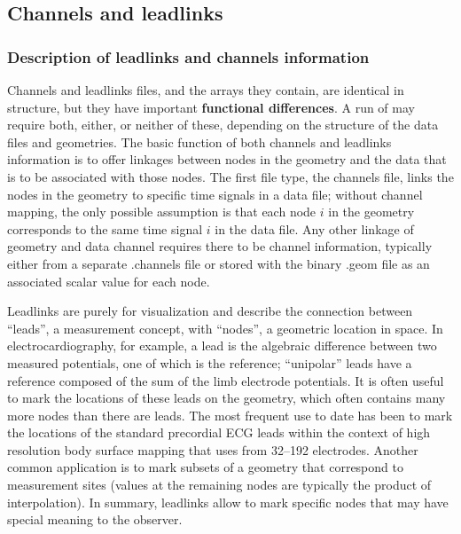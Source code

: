 
\subsection{Channels and leadlinks}
\label{sec:leadfiles} 

\subsubsection{Description of leadlinks and channels
information}

Channels and leadlinks files, and the arrays they
contain, are identical in structure, but they have important {\bf
functional differences}.  A run of \map{} may require both, either, or
neither of these, depending on the structure of the data files and
geometries. The basic function of both channels and leadlinks information
is to offer linkages between nodes in the geometry and the data that is to
be associated with those nodes.  The first file type, the channels file,
links the nodes in the geometry to specific time signals in a data file;
without channel mapping, the only possible assumption is that each node $i$
in the geometry corresponds to the same time signal $i$ in the data file.
Any other linkage of geometry and data channel requires there to be channel
information, typically either from a separate .channels file or stored with
the binary .geom file as an associated scalar value for each node.

Leadlinks are purely for visualization and describe the connection between
``leads'', a measurement concept, with ``nodes'', a geometric location in
space.  In electrocardiography, for example, a lead is the algebraic
difference between two measured potentials, one of which is the reference;
``unipolar'' leads have a reference composed of the sum of the limb
electrode potentials.  It is often useful to mark the locations of these
leads on the geometry, which often contains many more nodes than there are
leads.  The most frequent use to date has been to mark the locations of the
standard precordial ECG leads within the context of high resolution body
surface mapping that uses from 32--192 electrodes.  Another common
application is to mark subsets of a geometry that correspond to 
measurement sites (values at the remaining nodes are typically the product
of interpolation).  In summary, leadlinks allow \map{} to mark specific
nodes that may have special meaning to the observer.

